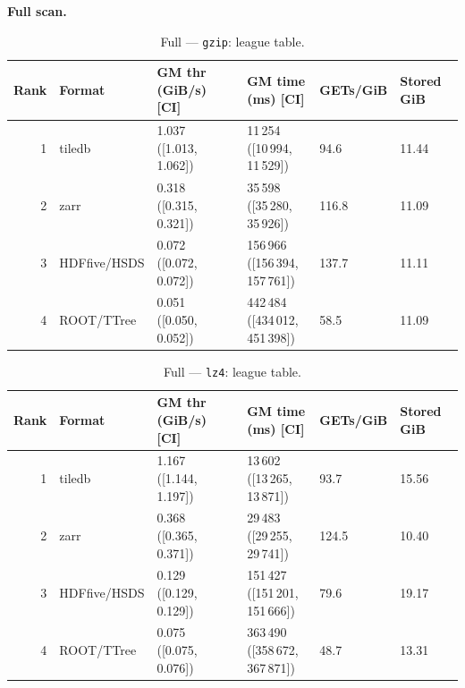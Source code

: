 \documentclass[nomenclature, english, bibtex]{kththesis}
\numberwithin{listing}{chapter}
\begin{document}
\textbf{Full scan.}
\begin{table}[H]
  \centering
  \caption{Full — \texttt{gzip}: league table.}
  \label{tab:league-full-gzip}
  \begin{tabular}{rlllll}
    \toprule
    Rank & Format & \gls{GM} thr (GiB/s) [\gls{CI}] & \gls{GM} time (ms) [\gls{CI}] & GETs/GiB & Stored GiB \\
    \midrule
    1 & tiledb & \makecell[r]{1.037\\\footnotesize([1.013, 1.062])} & \makecell[r]{11\,254\\\footnotesize([10\,994, 11\,529])} & 94.6  & 11.44 \\
    2 & zarr   & \makecell[r]{0.318\\\footnotesize([0.315, 0.321])} & \makecell[r]{35\,598\\\footnotesize([35\,280, 35\,926])} & 116.8 & 11.09 \\
    3 & \gls{HDFfive}/\gls{HSDS}   & \makecell[r]{0.072\\\footnotesize([0.072, 0.072])} & \makecell[r]{156\,966\\\footnotesize([156\,394, 157\,761])} & 137.7 & 11.11 \\
    4 & \gls{ROOT}/\gls{TTree}   & \makecell[r]{0.051\\\footnotesize([0.050, 0.052])} & \makecell[r]{442\,484\\\footnotesize([434\,012, 451\,398])} & 58.5  & 11.09 \\
    \bottomrule
  \end{tabular}
\end{table}

\begin{table}[H]
  \centering
  \caption{Full — \texttt{lz4}: league table.}
  \label{tab:league-full-lz4}
  \begin{tabular}{rlllll}
    \toprule
    Rank & Format & \gls{GM} thr (GiB/s) [\gls{CI}] & \gls{GM} time (ms) [\gls{CI}] & GETs/GiB & Stored GiB \\
    \midrule
    1 & tiledb & \makecell[r]{1.167\\\footnotesize([1.144, 1.197])} & \makecell[r]{13\,602\\\footnotesize([13\,265, 13\,871])} & 93.7  & 15.56 \\
    2 & zarr   & \makecell[r]{0.368\\\footnotesize([0.365, 0.371])} & \makecell[r]{29\,483\\\footnotesize([29\,255, 29\,741])} & 124.5 & 10.40 \\
    3 & \gls{HDFfive}/\gls{HSDS}   & \makecell[r]{0.129\\\footnotesize([0.129, 0.129])} & \makecell[r]{151\,427\\\footnotesize([151\,201, 151\,666])} & 79.6  & 19.17 \\
    4 & \gls{ROOT}/\gls{TTree}   & \makecell[r]{0.075\\\footnotesize([0.075, 0.076])} & \makecell[r]{363\,490\\\footnotesize([358\,672, 367\,871])} & 48.7  & 13.31 \\
    \bottomrule
  \end{tabular}
\end{table}
\end{document}
